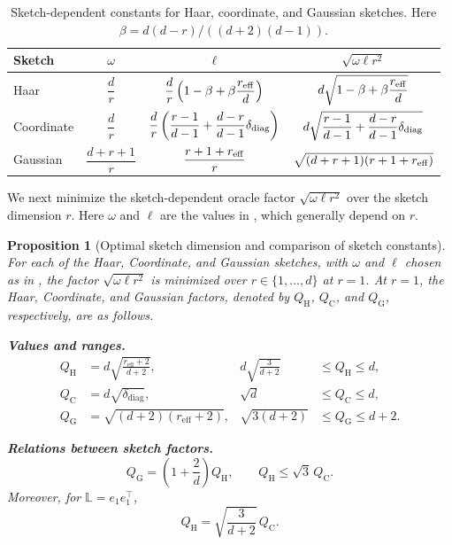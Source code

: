 \documentclass[10pt]{article}
\newtheorem{proposition}[proposition]{Proposition}
\newcommand{\Lmat}{\mathbb{L}}
\begin{document}
\begin{table}[t]
\centering
\caption{Sketch-dependent constants for Haar, coordinate, and Gaussian sketches.
Here \(\beta=d(d-r)/((d+2)(d-1))\).}
\label{tab:sketch_constants}
\begin{tabular}{lccc}
\toprule
Sketch & \(\omega\) & \(\ell\) & \(\sqrt{\omega\ell r^2}\) \\
\midrule
Haar &
\(\dfrac{d}{r}\) &
\(\dfrac{d}{r}\left(1-\beta+\beta\dfrac{r_{\rm eff}}{d}\right)\) &
\(d\sqrt{1-\beta+\beta\dfrac{r_{\rm eff}}{d}}\) \\
Coordinate &
\(\dfrac{d}{r}\) &
\(\dfrac{d}{r}\left(\dfrac{r-1}{d-1}
+\dfrac{d-r}{d-1}\delta_{\rm diag}\right)\) &
\(d\sqrt{\dfrac{r-1}{d-1}
+\dfrac{d-r}{d-1}\delta_{\rm diag}}\) \\
Gaussian &
\(\dfrac{d+r+1}{r}\) &
\(\dfrac{r+1+r_{\rm eff}}{r}\) &
\(\sqrt{(d+r+1)(r+1+r_{\rm eff})}\) \\
\bottomrule
\end{tabular}
\end{table}


We next minimize the sketch-dependent oracle factor
\(\sqrt{\omega\ell r^2}\) over the sketch dimension \(r\).
Here \(\omega\) and \(\ell\) are the values in , which
generally depend on \(r\).










\begin{proposition}[Optimal sketch dimension and comparison of sketch constants]
\label{prop:comp-sketch-basic}
For each of the Haar, Coordinate, and Gaussian sketches, with \(\omega\) and
\(\ell\) chosen as in , the factor
\(\sqrt{\omega\ell r^2}\) is minimized over \(r\in\{1,\dots,d\}\) at \(r=1\).
At \(r=1\), the Haar, Coordinate, and Gaussian factors, denoted by
\(Q_{\mathrm H}\), \(Q_{\mathrm C}\), and \(Q_{\mathrm G}\), respectively, are
as follows.

\smallskip
\noindent\normalfont\textbf{Values and ranges.}
\[
\begin{aligned}
Q_{\mathrm H}
&=d\sqrt{\frac{r_{\mathrm{eff}}+2}{d+2}},
&
d\sqrt{\frac{3}{d+2}}
&\le Q_{\mathrm H}\le d,\\
Q_{\mathrm C}
&=d\sqrt{\delta_{\mathrm{diag}}},
&
\sqrt d
&\le Q_{\mathrm C}\le d,\\
Q_{\mathrm G}
&=\sqrt{(d+2)(r_{\mathrm{eff}}+2)},
&
\sqrt{3(d+2)}
&\le Q_{\mathrm G}\le d+2.
\end{aligned}
\]

\smallskip
\noindent\normalfont\textbf{Relations between sketch factors.}
\[
Q_{\mathrm G}=\left(1+\frac{2}{d}\right)Q_{\mathrm H},
\qquad
Q_{\mathrm H}\le \sqrt3\,Q_{\mathrm C}.
\]
Moreover, for \(\Lmat=e_1e_1^\top\),
\[
Q_{\mathrm H}
=
\sqrt{\frac{3}{d+2}}\,Q_{\mathrm C}.
\]
\end{proposition}
\end{document}
